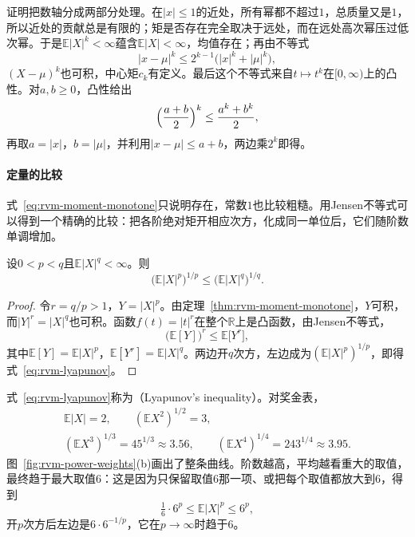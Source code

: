 证明把数轴分成两部分处理。在$\lvert x\rvert\leq1$的近处，所有幂都不超过$1$，总质量又是$1$，所以近处的贡献总是有限的；矩是否存在完全取决于远处，而在远处高次幂压过低次幂。于是$\mathbb{E}\lvert X\rvert^{k}<\infty$蕴含$\mathbb{E}\lvert X\rvert<\infty$，均值存在；再由不等式
\[
 \lvert x-\mu\rvert^{k}\leq2^{k-1}\bigl(\lvert x\rvert^{k}+\lvert\mu\rvert^{k}\bigr),
\]
$(X-\mu)^{k}$也可积，中心矩$c_k$有定义。最后这个不等式来自$t\mapsto t^{k}$在$[0,\infty)$上的凸性。对$a,b\geq0$，凸性给出
\[
 \Bigl(\frac{a+b}{2}\Bigr)^{k}\leq\frac{a^{k}+b^{k}}{2},
\]
再取$a=\lvert x\rvert$，$b=\lvert\mu\rvert$，并利用$\lvert x-\mu\rvert\leq a+b$，两边乘$2^{k}$即得。

\paragraph{定量的比较}
式~\eqref{eq:rvm-moment-monotone}只说明存在，常数$1$也比较粗糙。用Jensen不等式可以得到一个精确的比较：把各阶绝对矩开相应次方，化成同一单位后，它们随阶数单调增加。

\begin{theorem}[Lyapunov不等式]
\label{thm:rvm-lyapunov}
设$0<p<q$且$\mathbb{E}\lvert X\rvert^{q}<\infty$。则
\begin{equation}
 \bigl(\mathbb{E}\lvert X\rvert^{p}\bigr)^{1/p}\leq\bigl(\mathbb{E}\lvert X\rvert^{q}\bigr)^{1/q} .
 \label{eq:rvm-lyapunov}
\end{equation}
\end{theorem}

\begin{proof}
令$r=q/p>1$，$Y=\lvert X\rvert^{p}$。由定理~\ref{thm:rvm-moment-monotone}，$Y$可积，而$\lvert Y\rvert^{r}=\lvert X\rvert^{q}$也可积。函数$f(t)=\lvert t\rvert^{r}$在整个$\mathbb{R}$上是凸函数，由Jensen不等式，
\[
 \bigl(\mathbb{E}[Y]\bigr)^{r}\leq\mathbb{E}\bigl[Y^{r}\bigr],
\]
其中$\mathbb{E}[Y]=\mathbb{E}\lvert X\rvert^{p}$，$\mathbb{E}[Y^{r}]=\mathbb{E}\lvert X\rvert^{q}$。两边开$q$次方，左边成为$(\mathbb{E}\lvert X\rvert^{p})^{1/p}$，即得式~\eqref{eq:rvm-lyapunov}。
\end{proof}

式~\eqref{eq:rvm-lyapunov}称为（Lyapunov's inequality）。对奖金表，
\[
 \begin{gathered}
 \mathbb{E}\lvert X\rvert=2,\qquad (\mathbb{E}X^{2})^{1/2}=3,\\
 (\mathbb{E}X^{3})^{1/3}=45^{1/3}\approx3.56,\qquad (\mathbb{E}X^{4})^{1/4}=243^{1/4}\approx3.95 .
 \end{gathered}
\]
图~\ref{fig:rvm-power-weights}(b)画出了整条曲线。阶数越高，平均越看重大的取值，最终趋于最大取值$6$：这是因为只保留取值$6$那一项、或把每个取值都放大到$6$，得到
\[
 \tfrac16\cdot6^{p}\leq\mathbb{E}\lvert X\rvert^{p}\leq6^{p},
\]
开$p$次方后左边是$6\cdot6^{-1/p}$，它在$p\to\infty$时趋于$6$。

